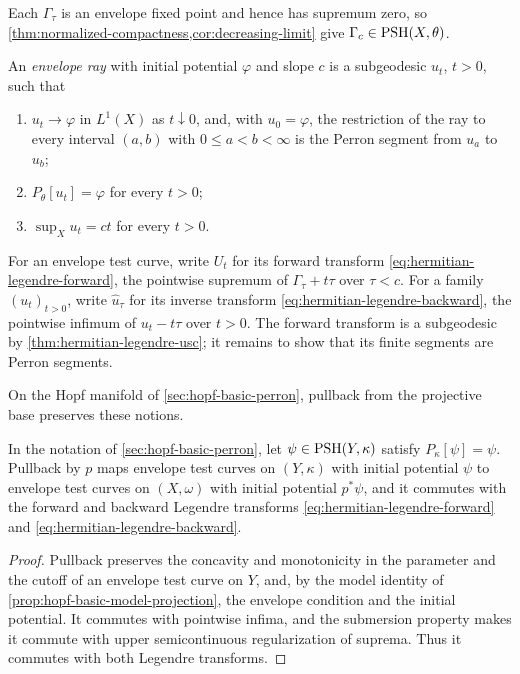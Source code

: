 Each $\Gamma_\tau$ is an envelope fixed point and hence has supremum zero, so \cref{thm:normalized-compactness,cor:decreasing-limit} give $\Gamma_c\in\mathrm{PSH}(X,\theta)$.

\begin{definition}\label{def:hermitian-envelope-ray}
An \emph{envelope ray} with initial potential $\varphi$ and slope $c$ is a subgeodesic $u_t$, $t>0$, such that
\begin{enumerate}
\item $u_t\to\varphi$ in $L^1(X)$ as $t\downarrow0$, and, with $u_0=\varphi$, the restriction of the ray to every interval $(a,b)$ with $0\leq a<b<\infty$ is the Perron segment from $u_a$ to $u_b$;
\item $P_\theta[u_t]=\varphi$ for every $t>0$;
\item $\sup_Xu_t=ct$ for every $t>0$.
\end{enumerate}
\end{definition}

For an envelope test curve, write $U_t$ for its forward transform \eqref{eq:hermitian-legendre-forward}, the pointwise supremum of $\Gamma_\tau+t\tau$ over $\tau<c$. For a family $(u_t)_{t>0}$, write $\widehat u_\tau$ for its inverse transform \eqref{eq:hermitian-legendre-backward}, the pointwise infimum of $u_t-t\tau$ over $t>0$. The forward transform is a subgeodesic by \cref{thm:hermitian-legendre-usc}; it remains to show that its finite segments are Perron segments.

On the Hopf manifold of \cref{sec:hopf-basic-perron}, pullback from the projective base preserves these notions.

\begin{corollary}\label{cor:hopf-basic-testcurve-pullback}
In the notation of \cref{sec:hopf-basic-perron}, let $\psi\in\mathrm{PSH}(Y,\kappa)$ satisfy $P_\kappa[\psi]=\psi$. Pullback by $p$ maps envelope test curves on $(Y,\kappa)$ with initial potential $\psi$ to envelope test curves on $(X,\omega)$ with initial potential $p^*\psi$, and it commutes with the forward and backward Legendre transforms \eqref{eq:hermitian-legendre-forward} and \eqref{eq:hermitian-legendre-backward}.
\end{corollary}
\begin{proof}
Pullback preserves the concavity and monotonicity in the parameter and the cutoff of an envelope test curve on $Y$, and, by the model identity of \cref{prop:hopf-basic-model-projection}, the envelope condition and the initial potential. It commutes with pointwise infima, and the submersion property makes it commute with upper semicontinuous regularization of suprema. Thus it commutes with both Legendre transforms.
\end{proof}


